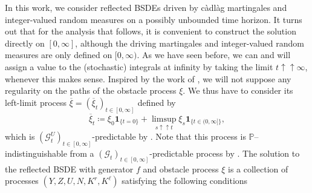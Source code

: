 \documentclass[10pt]{article} %
\newcommand\cG{\mathcal G}
\def \P{\mathbb{P}}
\begin{document}
In this work, we consider reflected BSDEs driven by c\`adl\`ag martingales and integer-valued random measures on a possibly unbounded time horizon. It turns out that for the analysis that follows, it is convenient to construct the solution directly on $[0,\infty]$, although the driving martingales and integer-valued random measures are only defined on $[0,\infty)$. As we have seen before, we can and will assign a value to the (stochastic) integrals at infinity by taking the limit $t \uparrow\uparrow \infty$, whenever this makes sense. Inspired by the work of \citeauthor*{grigorova2020optimal} \cite{grigorova2020optimal}, we will not suppose any regularity on the paths of the obstacle process $\xi$. We thus have to consider its left-limit process $\overline\xi = (\overline\xi_t)_{t \in [0,\infty]}$ defined by
\begin{equation*}
	\overline\xi_t \coloneqq
		\xi_0\mathbf{1}_{\{t = 0\}}+\limsup_{s \uparrow\uparrow t} \xi_s\mathbf{1}_{\{t\in (0,\infty]\}}, 
\end{equation*}
which is $(\cG^U_t)_{t \in [0,\infty]}$-predictable by . Note that this process is $\P$--indistinguishable from a $(\cG_t)_{t \in [0,\infty]}$-predictable process by \cite[Proposition 1.1]{jacod1979calcul}. The solution to the reflected BSDE with generator $f$ and obstacle process $\xi$ is a collection of processes $(Y,Z,U,N,K^r,K^\ell)$ satisfying the following conditions
\end{document}
